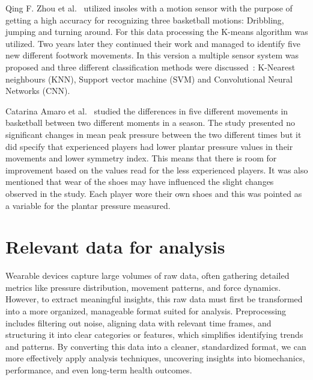 Qing F. Zhou et al.~\cite{basketballMotions} utilized insoles with a motion sensor with the purpose of getting a high accuracy for recognizing three basketball motions: 
Dribbling, jumping and turning around. For this data processing the K-means algorithm was utilized. 
Two years later they continued their work and managed to identify five new different 
footwork movements. In this version a multiple sensor system was proposed and three different classification methods were discussed~\cite{basketballFootwork}:
K-Nearest neighbours (KNN), Support vector machine (SVM) and Convolutional Neural Networks (CNN).


Catarina Amaro et al.~\cite{coimbra} studied the differences in five different movements in basketball between two different moments in a season. The study presented no significant 
changes in mean peak pressure between the two different times but it did specify that experienced players had lower plantar pressure values in their movements and lower symmetry index. This means that there 
is room for improvement based on the values read for the less experienced players. It was also mentioned that wear of the shoes may have influenced the slight changes observed in the study. 
Each player wore their own shoes and this was pointed as a variable for the plantar pressure measured.

\newpage

\section{Relevant data for analysis}
\label{sec:relevant_data_for_analysis}

Wearable devices capture large volumes of raw data, often gathering detailed metrics like pressure distribution, movement patterns, and force dynamics. However, to extract meaningful 
insights, this raw data must first be transformed into a more organized, manageable format suited for analysis. Preprocessing includes filtering out noise, aligning data with relevant 
time frames, and structuring it into clear categories or features, which simplifies identifying trends and patterns. By converting this data into a cleaner, standardized format, we can 
more effectively apply analysis techniques, uncovering insights into biomechanics, performance, and even long-term health outcomes.


